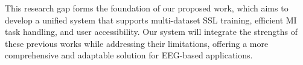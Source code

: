 This research gap forms the foundation of our proposed work, which aims to develop a unified system that supports multi-dataset SSL training, efficient MI task handling, and user accessibility. Our system will integrate the strengths of these previous works while addressing their limitations, offering a more comprehensive and adaptable solution for EEG-based applications.

